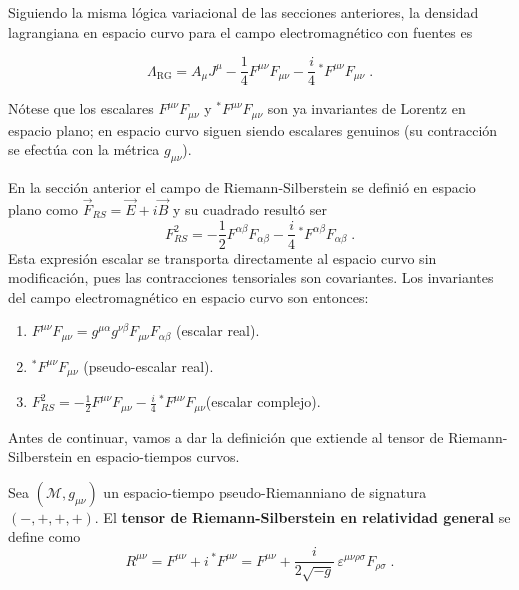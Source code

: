             Siguiendo la misma lógica variacional de las secciones anteriores, la densidad lagrangiana en espacio curvo para el campo electromagnético con fuentes es

            \begin{equation}\label{eq:LagDenRG}
                \Lambda_{\text{RG}}
                    = A_{\mu}J^{\mu}
                    -\frac{1}{4}F^{\mu\nu}F_{\mu\nu}
                    -\frac{i}{4}\,{}^{*}F^{\mu\nu}F_{\mu\nu}\;.
            \end{equation}

            Nótese que los escalares $F^{\mu\nu}F_{\mu\nu}$ y ${}^{*}F^{\mu\nu}F_{\mu\nu}$ son ya invariantes de Lorentz en espacio plano; en espacio curvo siguen siendo escalares genuinos (su contracción se efectúa con la métrica $g_{\mu\nu}$).

            En la sección anterior el campo de Riemann-Silberstein se definió en espacio plano como $\vec{F}_{RS}=\vec{E}+i\vec{B}$ y su cuadrado resultó ser
            \begin{equation*}
                F^2_{RS} = -\frac{1}{2}F^{\alpha\beta}F_{\alpha\beta} - \frac{i}{4}\,{}^{*}F^{\alpha\beta}F_{\alpha\beta}\;.
            \end{equation*}
            Esta expresión escalar se transporta directamente al espacio curvo sin modificación, pues las contracciones tensoriales son covariantes.  Los invariantes del campo electromagnético en espacio curvo son entonces:
            \begin{enumerate}
                \item $F^{\mu\nu}F_{\mu\nu} = g^{\mu\alpha}g^{\nu\beta}F_{\mu\nu}F_{\alpha\beta}$ (escalar real).
                \item ${}^{*}F^{\mu\nu}F_{\mu\nu}$ (pseudo-escalar real).
                \item $F^2_{RS} = -\frac{1}{2}F^{\mu\nu}F_{\mu\nu} -\frac{i}{4}\,{}^{*}F^{\mu\nu}F_{\mu\nu}$(escalar complejo).
            \end{enumerate}

            Antes de continuar, vamos a dar la definición que extiende al tensor de Riemann-Silberstein en espacio-tiempos curvos.

            \begin{myDef} \label{def:RSRG}
                Sea $(\mathcal{M},g_{\mu\nu})$ un espacio-tiempo pseudo-Riemanniano de signatura $(-,+,+,+)$.  El \textbf{tensor de Riemann-Silberstein en relatividad general} se define como
                \begin{equation}\label{eq:RSRG}
                    \boxed{R^{\mu\nu} = F^{\mu\nu} + i\,{}^{*}F^{\mu\nu} = F^{\mu\nu} + \frac{i}{2\sqrt{-g}}\,\varepsilon^{\mu\nu\rho\sigma}F_{\rho\sigma} \;.}
                \end{equation}
            \end{myDef}

